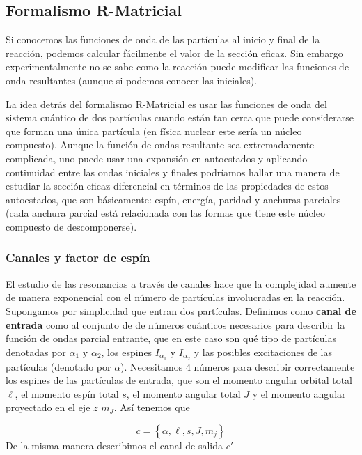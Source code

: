 \documentclass[fleqn,10pt]{SelfArx} %
\begin{document}
\subsection{Formalismo R-Matricial}

Si conocemos las funciones de onda de las partículas al inicio y final de la reacción, podemos calcular fácilmente el valor de la sección eficaz. Sin embargo experimentalmente no se sabe como la reacción puede modificar las funciones de onda resultantes (aunque si podemos conocer las iniciales). 

La idea detrás del formalismo R-Matricial es usar las funciones de onda del sistema cuántico de dos partículas cuando están tan cerca que puede considerarse que forman una única partícula (en física nuclear este sería un núcleo compuesto). Aunque la función de ondas resultante sea extremadamente complicada, uno puede usar una expansión en autoestados y aplicando continuidad entre las ondas iniciales y finales podríamos hallar una manera de estudiar la sección eficaz diferencial en términos de las propiedades de estos autoestados, que son básicamente: espín, energía, paridad y anchuras parciales (cada anchura parcial está relacionada con las formas que tiene este núcleo compuesto de descomponerse).

\subsubsection{Canales y factor de espín}

El estudio de las resonancias a través de canales hace que la complejidad aumente de manera exponencial con el número de partículas involucradas en la reacción. Supongamos por simplicidad que entran dos partículas. Definimos como \textbf{canal de entrada} como al conjunto de de números cuánticos necesarios para describir la función de ondas parcial entrante, que en este caso son qué tipo de partículas denotadas por  $\alpha_1$ y $\alpha_2$, los espines $I_{\alpha_1}$ y $I_{\alpha_2}$ y las posibles excitaciones de las partículas (denotado por $\alpha$). Necesitamos 4 números para describir correctamente los espines de las partículas de entrada, que son el momento angular orbital total $\ell$, el momento espín total $s$, el momento angular total $J$ y el momento angular proyectado en el eje $z$ $m_J$. Así tenemos que

\begin{equation}
	c = \left\lbrace \alpha,\ell,s,J,m_j \right\rbrace
\end{equation}
De la misma manera describimos el canal de salida $c'$
\end{document}
